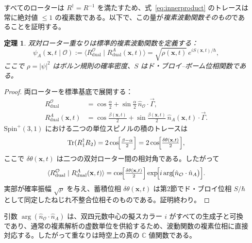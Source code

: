\documentclass[a4paper]{article}
\newtheorem{theorem}{定理}
\begin{document}
すべてのローターは $R^\dagger = R^{-1}$ を満たすため、式~\eqref{eq:innerproduct} のトレースは常に絶対値 $\leq 1$ の複素数である。以下で、この量が\emph{複素波動関数そのもの}であることを証明する。

\begin{theorem}
双対ローター重なりは標準的複素波動関数を定義する：
\begin{equation}
\psi_A(\mathbf{x},t \mid \mathcal{O})
:= \langle R_{\text{dual}}^{\mathcal{O}} \mid R_{\text{dual}}^{A}(\mathbf{x},t) \rangle
= \sqrt{\rho(\mathbf{x},t)} \, e^{i S(\mathbf{x},t)/\hbar},
\label{eq:psi}
\end{equation}
ここで $\rho = |\psi|^2$ はボルン規則の確率密度、$S$ はド・ブロイ--ボーム位相関数である。
\end{theorem}

\begin{proof}
両ローターを標準基底で展開する：
\begin{align}
R_{\text{dual}}^{\mathcal{O}} &= \cos\!\frac{\alpha}{2} + \sin\!\frac{\alpha}{2}\, \hat{n}_\mathcal{O}\cdot\vec{\Gamma}, \\[4pt]
R_{\text{dual}}^{A}(\mathbf{x},t) &= \cos\!\frac{\beta(\mathbf{x},t)}{2} + \sin\!\frac{\beta(\mathbf{x},t)}{2}\, \hat{n}_A(\mathbf{x},t)\cdot\vec{\Gamma}.
\end{align}
$\mathrm{Spin}^+(3,1)$ における二つの単位スピノルの積のトレースは
\begin{equation}
\operatorname{Tr}(R_1^\dagger R_2) = 2 \cos\!\Bigl[\tfrac{\beta - \alpha}{2}\Bigr]
          = 2 \cos\!\Bigl[\tfrac{\delta\theta(\mathbf{x},t)}{2}\Bigr],
\end{equation}
ここで $\delta\theta(\mathbf{x},t)$ は二つの双対ローター間の相対角である。したがって
\begin{equation}
\langle R_{\text{dual}}^{\mathcal{O}} \mid R_{\text{dual}}^{A}(\mathbf{x},t) \rangle
= \cos\!\Bigl[\tfrac{\delta\theta(\mathbf{x},t)}{2}\Bigr]
  \exp\!\Bigl[i \arg\!\bigl(\hat{n}_\mathcal{O}\cdot\hat{n}_A\bigr) \Bigr].
\end{equation}
実部が確率振幅 $\sqrt{\rho}$ を与え、蓄積位相 $\delta\theta(\mathbf{x},t)$ は第2節でド・ブロイ位相 $S/\hbar$ として同定したねじれ不整合位相そのものである。証明終わり。
\end{proof}

引数 \(\arg(\hat{n}_\mathcal{O}\cdot\hat{n}_A)\) は、双四元数中心の擬スカラー \(i\) がすべての生成子と可換であり、通常の複素解析の虚数単位を供給するため、波動関数の複素位相に直接対応する。したがって重なりは時空上の真の \(\mathbb{C}\) 値関数である。
\end{document}
